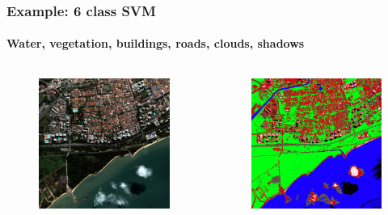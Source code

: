 \documentclass[compress]{beamer}
\begin{document}
\begin{frame}
\frametitle{Example: 6 class SVM }
\framesubtitle{Water, vegetation, buildings, roads, clouds, shadows}
\begin{columns}
\begin{column}{0.5\textwidth}
\begin{figure}[]
  \includegraphics[width=1.0\textwidth]{radio2-extract-3b.jpg}
\end{figure}
\end{column}
\begin{column}{0.5\textwidth}
\begin{figure}[]
  \includegraphics[width=1.0\textwidth]{svm-6-classes.png}
\end{figure}
\end{column}
\end{columns}
\end{frame}
\end{document}
